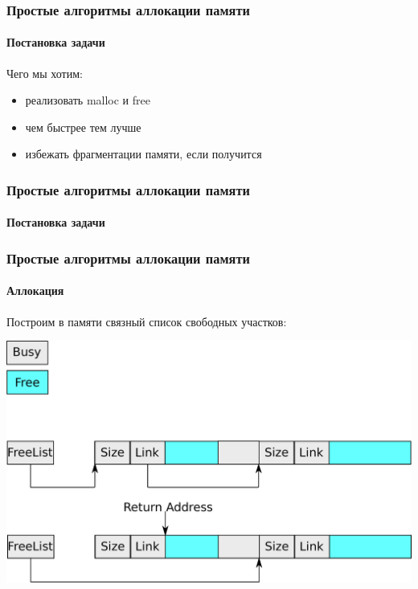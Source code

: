 \begin{frame}
\frametitle{Простые алгоритмы аллокации памяти}
\framesubtitle{Постановка задачи}

Чего мы хотим:
\begin{itemize}
  \item<2-> реализовать malloc и free
  \item<3-> чем быстрее тем лучше
  \item<4-> избежать фрагментации памяти, если получится
\end{itemize}
\end{frame}

\begin{frame}
\frametitle{Простые алгоритмы аллокации памяти}
\framesubtitle{Постановка задачи}



\end{frame}

\begin{frame}
\frametitle{Простые алгоритмы аллокации памяти}
\framesubtitle{Аллокация}

Построим в памяти связный список свободных участков:

\includegraphics[width=.9\linewidth]{alloc-alloc0}
\end{frame}

